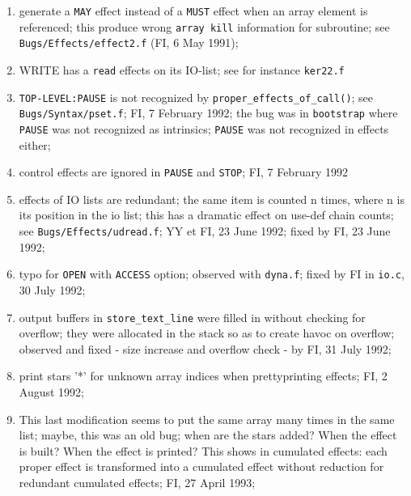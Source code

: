 \begin{enumerate}
  \item generate a \verb+MAY+ effect instead of a \verb+MUST+ effect when
        an array element is referenced; this produce wrong \verb+array kill+
        information for subroutine; see \verb+Bugs/Effects/effect2.f+
        (FI, 6 May 1991);

  \item WRITE has a \verb+read+ effects on its IO-list; see for instance
        \verb+ker22.f+

  \item \verb+TOP-LEVEL:PAUSE+ is not recognized by 
        \verb+proper_effects_of_call()+;
        see \verb+Bugs/Syntax/pset.f+; FI, 7 February 1992;
        the bug was in \verb+bootstrap+ where \verb+PAUSE+ was not
        recognized as intrinsics; \verb+PAUSE+ was not recognized
        in effects either;

  \item control effects are ignored in \verb+PAUSE+ and \verb+STOP+;
        FI, 7 February 1992

  \item effects of IO lists are redundant; the same item is counted
        n times, where n is its position in the io list;
        this has a dramatic effect on use-def chain counts;
        see \verb+Bugs/Effects/udread.f+; YY et FI, 23 June 1992;
        fixed by FI, 23 June 1992;

  \item typo for \verb+OPEN+ with \verb+ACCESS+ option; observed
        with \verb+dyna.f+; fixed by FI in \verb+io.c+, 30 July 1992;

  \item output buffers in \verb+store_text_line+ were filled in without
        checking for overflow; they were allocated in the stack so
        as to create havoc on overflow; observed and fixed - size
        increase and overflow check - by FI,
        31 July 1992;

  \item print stars '*' for unknown array indices when prettyprinting
        effects; FI, 2 August 1992;

  \item This last modification seems to put the same array many times in
        the same list; maybe, this was an old bug; when are the stars
        added? When the effect is built? When the effect is printed?
        This shows in cumulated effects: each proper effect is
        transformed into a cumulated effect without reduction for
        redundant cumulated effects; FI, 27 April 1993;


\end{enumerate}
